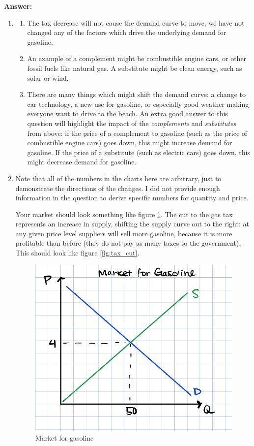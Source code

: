 \documentclass[12pt]{article}
\begin{document}
\textbf{Answer: }
\begin{enumerate}
\item 
\begin{enumerate}
    \item The tax decrease will not cause the demand curve to move; we have not changed any of the factors which drive the underlying demand for gasoline.
    \item An example of a complement might be combustible engine cars, or other fossil fuels like natural gas. A substitute might be clean energy, such as solar or wind.
    \item There are many things which might shift the demand curve: a change to car technology, a new use for gasoline, or especially good weather making everyone want to drive to the beach. An extra good answer to this question will highlight the impact of the \textit{complements} and \textit{substitutes} from above: if the price of a complement to gasoline (such as the price of combustible engine cars) goes down, this might increase demand for gasoline. If the price of a substitute (such as electric cars) goes down, this might decrease demand for gasoline.
\end{enumerate}

\item Note that all of the numbers in the charts here are arbitrary, just to demonstrate the directions of the changes. I did not provide enough information in the question to derive specific numbers for quantity and price.

Your market should look something like figure \ref{fig:market_for_gas}. The cut to the gas tax represents an increase in supply, shifting the supply curve out to the right: at any given price level suppliers will sell more gasoline, because it is more profitable than before (they do not pay as many taxes to the government). This should look like figure \ref{fig:tax_cut}.

\begin{figure}[H]
    \centering
    \includegraphics[width=.6\textwidth]{market_for_gas.png}
    \caption{Market for gasoline}
    \label{fig:market_for_gas}
\end{figure}


\end{enumerate}
\end{document}
